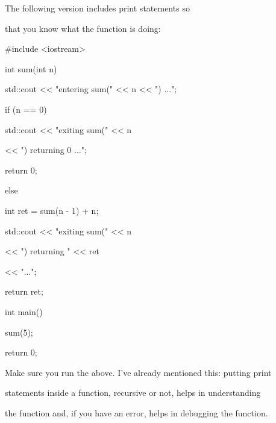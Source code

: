 The following version includes print statements so

that you know what the function is doing:



\begin{consolethree}[escapeinside=||]

#include <iostream>



int sum(int n)

{

    std::cout << "entering sum(" << n << ") ...\n";

    if (n == 0)

    {

        std::cout << "exiting sum(" << n

                  << ") returning 0 ...\n";

        return 0;

    }

    else

    {

        int ret = sum(n - 1) + n;

        std::cout << "exiting sum(" << n

                  << ") returning " << ret

                  << "...\n";

        return ret;

    }

}



int main()

{

    sum(5);

    return 0;

}

\end{consolethree}



Make sure you run the above. I've already mentioned this: putting print

statements inside a function, recursive or not, helps in understanding

the function and, if you have an error, helps in debugging the function.

